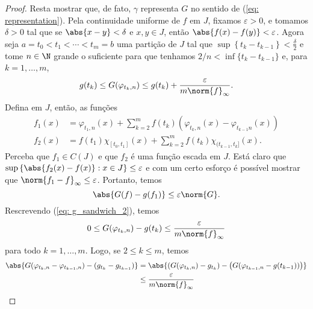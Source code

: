 \begin{proof}
    Resta mostrar que, de fato, \( \gamma \) representa \( G \) no sentido de (\ref{eq: representation}).
    Pela continuidade uniforme de \( f \) em \( J \), fixamos \( \varepsilon > 0 \), e tomamos \( \delta > 0 \) tal que se \( \abs{ x - y } < \delta \) e \( x, y \in J \), então \( \abs{ f(x) - f(y) } < \varepsilon \).
    Agora seja \( a = t_{ 0 } < t_{ 1 } < \cdots < t_{ m } = b \) uma partição de \( J \) tal que \( \sup \left\{ t_{ k } - t_{ k-1 } \right\} < \frac{ \delta }{ 2 } \) e tome \( n \in \N \) grande o suficiente para que tenhamos \( 2/n < \inf \{t_{ k } - t_{ k-1 }\} \) e, para \( k = 1, \dots, m \),
    \begin{equation}
        g(t_{ k }) \leq G(\varphi_{ t_{ k }, n }) \leq g(t_{ k }) + \frac{ \varepsilon }{ m \norm{ f }_{ \infty } }
        \label{eq: g_sandwich_2}
    .\end{equation}
    Defina em \( J \), então, as funções
    \begin{align*}
        f_{ 1 }(x)
        &= \varphi_{ t_{ 1 }, n }(x) + \sum_{ k=2 }^{ m } f(t_{ k }) \left(
            \varphi_{ t_{ k }, n }(x) - \varphi_{ t_{ k-1 }n }(x)
        \right) \\
        f_{ 2 }(x)
        &= f(t_{ 1 }) \chi_{ [t_{ 0 }, t_{ 1 }] }(x) +
        \sum_{ k=2 }^{ m } f(t_{ k }) \chi_{ (t_{ k-1 }, t_{ k }] }(x)
    .\end{align*}
    Perceba que \( f_{ 1 } \in C(J) \) e que \( f_{ 2 } \) é uma função escada em \( J \).
    Está claro que \( \sup \left\{ \abs{ f_{ 2 }(x) - f(x) } : x \in J \right\} \leq \varepsilon \) e com um certo esforço é possível mostrar que \( \norm{ f_{ 1 } - f }_{ \infty } \leq \varepsilon \).
    Portanto, temos
    \begin{equation}
        \abs{ G(f) - g(f_{ 1 }) } \leq \varepsilon \norm{ G }
        \label{eq: triangle_1}
    .\end{equation}
    Rescrevendo (\ref{eq: g_sandwich_2}), temos \[
        0 \leq G(\varphi_{ t_{ k }, n }) - g(t_{ k }) \leq \frac{ \varepsilon }{ m \norm{ f }_{ \infty } }
    \]
    para todo \( k = 1, \dots, m \).
    Logo, se \( 2 \leq k \leq m \), temos
    \begin{align*}
        \abs{ G(\varphi_{ t_{ k }, n } - \varphi_{ t_{ k-1 }, n }) - (g_{ t_{ k } } - g_{ t_{ k-1 } })}
        &= \abs{ \left(
            G(\varphi_{ t_{ k }, n }) - g_{ t_{ k } }
        \right) -
        \left(
            G(\varphi_{ t_{ k-1 }, n } - g(t_{ k-1 }))
        \right)} \\
        &\leq \frac{ \varepsilon }{ m \norm{ f }_{ \infty } }

\end{align*}
\end{proof}
